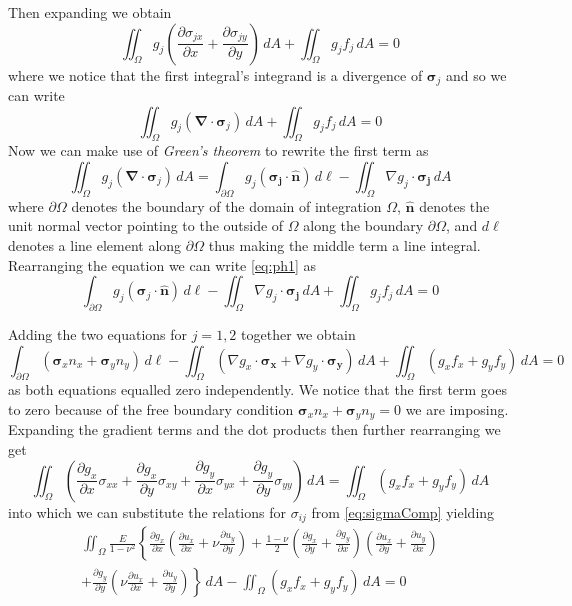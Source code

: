 \documentclass[11pt]{article}
\newcommand\p[2]{\frac{\partial #1}{\partial #2}}
\begin{document}
Then expanding we obtain
\begin{equation*}
\iint_\Omega g_j  \left( \p{\sigma_{jx}}{x} + \p{\sigma_{jy}}{y} \right) \, dA + \iint_\Omega g_j f_j \, dA = 0
\end{equation*}
where we notice that the first integral's integrand is a divergence of $\bm{\sigma}_j$ and so we can write
\begin{equation} \label{eq:ph1}
\iint_\Omega g_j \left( \bm{\nabla \cdot \sigma}_j \right) \, dA + \iint_\Omega g_j f_j \, dA = 0
\end{equation}
Now we can make use of \emph{Green's theorem} to rewrite the first term as
\begin{equation*}
  \iint_\Omega g_j \left( \bm{\nabla \cdot \sigma}_j \right) \, dA
  = \int_{\partial\Omega} g_j  \left( \bm{\sigma_j \cdot \hat{n}} \right) \, d\ell
  - \iint_\Omega \nabla g_j \cdot \bm{\sigma_j} \, dA
\end{equation*}
where $\partial\Omega$ denotes the boundary of the domain of integration $\Omega$, $\bm{\hat{n}}$ denotes the unit normal vector pointing to the outside of $\Omega$ along the boundary $\partial\Omega$, and $d\ell$ denotes a line element along $\partial\Omega$ thus making the middle term a line integral. Rearranging the equation we can write \eqref{eq:ph1} as
\begin{equation}
  \int_{\partial\Omega} g_j  \left( \bm{\sigma}_j \cdot \bm{\hat{n}} \right) \, d\ell
  - \iint_\Omega \nabla g_j \cdot \bm{\sigma_j} \, dA
  + \iint_\Omega g_j f_j \, dA = 0
\end{equation}

Adding the two equations for $j=1,2$ together we obtain
\begin{equation} \label{eq:withLI}
    \int_{\partial\Omega} \left( \bm{\sigma}_x n_x + \bm{\sigma}_y n_y \right) \, d\ell
  - \iint_\Omega \left( \nabla g_x \cdot \bm{\sigma_x} + \nabla g_y \cdot \bm{\sigma_y} \right) \, dA
  + \iint_\Omega \left( g_x f_x + g_y f_y \right) \, dA= 0
\end{equation}
as both equations equalled zero independently. We notice that the first term goes to zero because of the free boundary condition  $\bm{\sigma}_x n_x + \bm{\sigma}_y n_y = 0$ we are imposing. Expanding the gradient terms and the dot products then further rearranging we get
\begin{equation}
  \iint_\Omega \left( \p{g_x}{x}\sigma_{xx} + \p{g_x}{y}\sigma_{xy} + \p{g_y}{x}\sigma_{yx} + \p{g_y}{y}\sigma_{yy} \right) \, dA = \iint_\Omega \left( g_x f_x + g_y f_y \right) \, dA
\end{equation}
into which we can substitute the relations for $\sigma_{ij}$ from \eqref{eq:sigmaComp} yielding
\begin{multline}
  \iint_\Omega \frac{E}{1-\nu^2} \left\{
    \p{g_x}{x} \left( \p{u_x}{x} + \nu\p{u_y}{y} \right)
    + \frac{1-\nu}{2} \left( \p{g_x}{y} + \p{g_y}{x} \right)
      \left( \p{u_x}{y} + \p{u_y}{x} \right) \right. \\ \left.
    + \p{g_y}{y} \left(\nu\p{u_x}{x} + \p{u_y}{y} \right)
  \right\} \, dA
  - \iint_\Omega \left( g_x f_x + g_y f_y \right) \, dA
  = 0
\end{multline}
\end{document}
